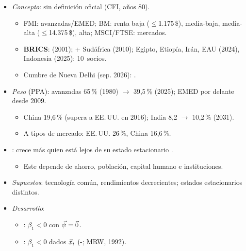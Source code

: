 \documentclass{article}
\begin{document}
\begin{columnas}
\begin{itemize}
\item \emph{Concepto}: sin definición oficial (CFI, años 80).
  \begin{itemize}
  \item FMI: avanzadas/EMED; BM: renta baja ($\leq$1.175\,\$), media-baja, media-alta ($\leq$14.375\,\$), alta; MSCI/FTSE: mercados.
  \item \textbf{BRICS}:  (2001); + Sudáfrica (2010); Egipto, Etiopía, Irán, EAU (2024), Indonesia (2025); 10~socios.
  \item Cumbre de Nueva Delhi (sep. 2026): .
  \end{itemize}
\item \emph{Peso} (PPA): avanzadas 65\,\% (1980) $\to$ 39,5\,\% (2025); EMED por delante desde 2009.
  \begin{itemize}
  \item China 19,6\,\% (supera a EE.\,UU. en 2016); India 8,2 $\to$ 10,2\,\% (2031).
  \item A tipos de mercado: EE.\,UU. 26\,\%, China 16,6\,\%.
  \end{itemize}
\end{itemize}
\begin{itemize}
\item {}: crece más quien está lejos de su estado estacionario .
  \begin{itemize}
  \item Este depende de ahorro, población, capital humano e instituciones.
  \end{itemize}
\end{itemize}
\begin{itemize}
\item \emph{Supuestos}: tecnología común, rendimientos decrecientes; estados estacionarios distintos.
\item \emph{Desarrollo}:
  \begin{itemize}
  \item {}: $\beta_1<0$ con $\vec{\psi}=\vec{0}$.
  \item {}: $\beta_1<0$ dados $\vec{x}_i$ (-; MRW, 1992).

\end{itemize}
\end{itemize}
\end{columnas}
\end{document}
